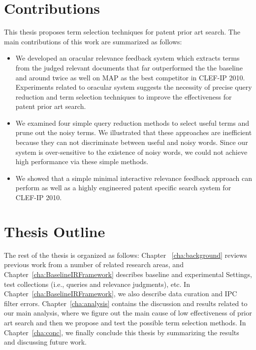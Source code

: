 \section{Contributions}
\label{sec:Contributions}
This thesis proposes term selection techniques for patent prior art search.
The main contributions of this work are summarized as follows:
\begin{itemize}
\item We developed an oracular relevance feedback system which extracts terms from the judged relevant documents that far outperformed the the baseline and around twice as well on MAP as the best competitor in CLEF-IP 2010. Experiments related to oracular system suggests the necessity of precise query reduction and term selection techniques to improve the effectiveness for patent prior art search.
\item We examined four simple query reduction methods to select useful terms and prune out the noisy terms. We illustrated that these approaches are inefficient because they can not discriminate between useful and noisy words. Since our system is over-sensitive to the existence of noisy words, we could not achieve high performance via these simple methods.
\item We showed that a simple minimal interactive relevance feedback approach can perform as well as a highly engineered patent specific search system for CLEF-IP 2010.
\end{itemize}
\section{Thesis Outline}
\label{sec:outline}
The rest of the thesis is organized as follows: Chapter ~\ref{cha:background} reviews previous work from a number
of related research areas, and Chapter~\ref{cha:BaselineIRFramework} describes baseline and experimental Settings, 
test collections (i.e., queries and relevance judgments),
etc. In Chapter~\ref{cha:BaselineIRFramework}, we also describe data curation and IPC filter errors.
Chapter~\ref{cha:analysis} contains the discussion and results related to our main analysis, where we figure out 
the main cause of low effectiveness of prior art search and then we propose and test the possible term selection methods. 
In Chapter~\ref{cha:conc}, we finally conclude this thesis by 
summarizing the results and discussing future work.



